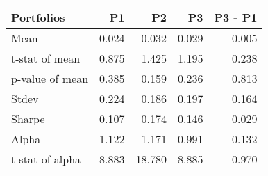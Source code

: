 \begin{tabular}{lrrrr}
\toprule
Portfolios & P1 & P2 & P3 & P3 - P1 \\
\midrule
Mean & 0.024 & 0.032 & 0.029 & 0.005 \\
t-stat of mean & 0.875 & 1.425 & 1.195 & 0.238 \\
p-value of mean & 0.385 & 0.159 & 0.236 & 0.813 \\
Stdev & 0.224 & 0.186 & 0.197 & 0.164 \\
Sharpe & 0.107 & 0.174 & 0.146 & 0.029 \\
Alpha & 1.122 & 1.171 & 0.991 & -0.132 \\
t-stat of alpha & 8.883 & 18.780 & 8.885 & -0.970 \\
\bottomrule
\end{tabular}
